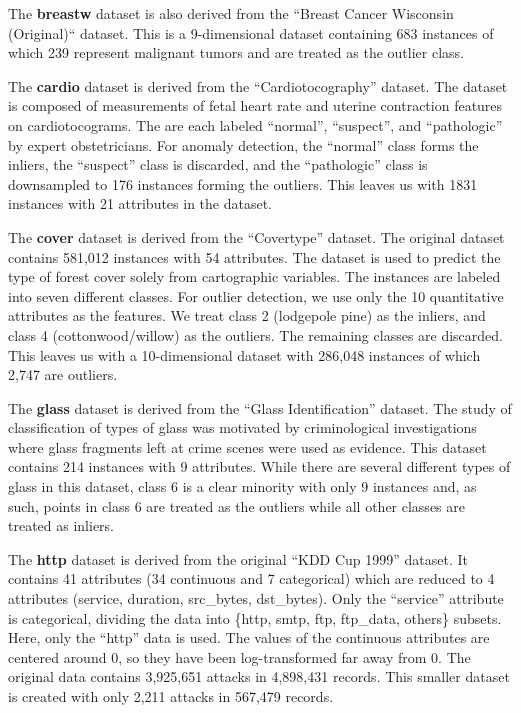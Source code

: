 The \textbf{breastw} dataset is also derived from the ``Breast Cancer Wisconsin (Original)`` dataset.
This is a 9-dimensional dataset containing 683 instances of which 239 represent malignant tumors and are treated as the outlier class.

The \textbf{cardio} dataset is derived from the ``Cardiotocography'' dataset.
The dataset is composed of measurements of fetal heart rate and uterine contraction features on cardiotocograms.
The are each labeled ``normal'', ``suspect'', and ``pathologic'' by expert obstetricians.
For anomaly detection, the ``normal'' class forms the inliers, the ``suspect'' class is discarded, and the ``pathologic'' class is downsampled to 176 instances forming the outliers.
This leaves us with 1831 instances with 21 attributes in the dataset.

The \textbf{cover} dataset is derived from the ``Covertype'' dataset.
The original dataset contains 581,012 instances with 54 attributes.
The dataset is used to predict the type of forest cover solely from cartographic variables.
The instances are labeled into seven different classes.
For outlier detection, we use only the 10 quantitative attributes as the features.
We treat class 2 (lodgepole pine) as the inliers, and class 4 (cottonwood/willow) as the outliers.
The remaining classes are discarded.
This leaves us with a 10-dimensional dataset with 286,048 instances of which 2,747 are outliers.

The \textbf{glass} dataset is derived from the ``Glass Identification'' dataset.
The study of classification of types of glass was motivated by criminological investigations where glass fragments left at crime scenes were used as evidence.
This dataset contains 214 instances with 9 attributes.
While there are several different types of glass in this dataset, class 6 is a clear minority with only 9 instances and, as such, points in class 6 are treated as the outliers while all other classes are treated as inliers.

The \textbf{http} dataset is derived from the original ``KDD Cup 1999'' dataset.
It contains 41 attributes (34 continuous and 7 categorical) which are reduced to 4 attributes (service, duration, src\_bytes, dst\_bytes).
Only the ``service'' attribute is categorical, dividing the data into \{http, smtp, ftp, ftp\_data, others\} subsets.
Here, only the ``http'' data is used.
The values of the continuous attributes are centered around 0, so they have been log-transformed far away from 0.
The original data contains 3,925,651 attacks in 4,898,431 records.
This smaller dataset is created with only 2,211 attacks in 567,479 records.

